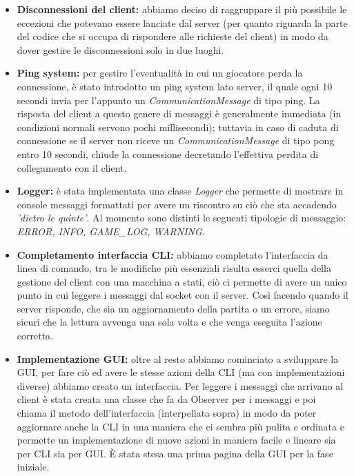 \documentclass[a4paper, 12pt]{article}
\begin{document}
	\begin{itemize}
		\item \textbf{Disconnessioni del client:} abbiamo deciso di raggruppare il più possibile le eccezioni che potevano essere lanciate dal server (per quanto riguarda la parte del codice che si occupa di rispondere alle richieste del client) in modo da dover gestire le disconnessioni solo in due luoghi.
		\item \textbf{Ping system:} per gestire l'eventualità in cui un giocatore perda la connessione, è stato introdotto un ping system lato server, il quale ogni 10 secondi invia per l'appunto un \textit{CommunicationMessage} di tipo ping. La risposta del client a questo genere di messaggi è generalmente immediata (in condizioni normali servono pochi millisecondi); tuttavia in caso di caduta di connessione se il server non riceve un \textit{CommunicationMessage} di tipo pong entro 10 secondi, chiude la connessione decretando l'effettiva perdita di collegamento con il client.
		\item \textbf{Logger:} è stata implementata una classe \textit{Logger} che permette di mostrare in console messaggi formattati per avere un riscontro su ciò che sta accadendo \textit{'dietro le quinte'}. Al momento sono distinti le seguenti tipologie di messaggio: \textit{ERROR, INFO, GAME\_LOG, WARNING}.
		\item \textbf{Completamento interfaccia CLI:} abbiamo completato l'interfaccia da linea di comando, tra le modifiche più essenziali risulta esserci quella della gestione del client con una macchina a stati, ciò ci permette di avere un unico punto in cui leggere i messaggi dal socket con il server. Così facendo quando il server risponde, che sia un aggiornamento della partita o un errore, siamo sicuri che la lettura avvenga una sola volta e che venga eseguita l'azione corretta.
		\item \textbf{Implementazione GUI:} oltre al resto abbiamo cominciato a sviluppare la GUI, per fare ciò ed avere le stesse azioni della CLI (ma con implementazioni diverse) abbiamo creato un interfaccia. 
		Per leggere i messaggi che arrivano al client è stata creata una classe che fa da Observer per i messaggi e poi chiama il metodo dell'interfaccia (interpellata sopra) in modo da poter aggiornare anche la CLI in una maniera che ci sembra più pulita e ordinata e permette un implementazione di nuove azioni in maniera facile e lineare sia per CLI sia per GUI. 
		È stata stesa una prima pagina della GUI per la fase iniziale.\\
	\end{itemize}
\end{document}
